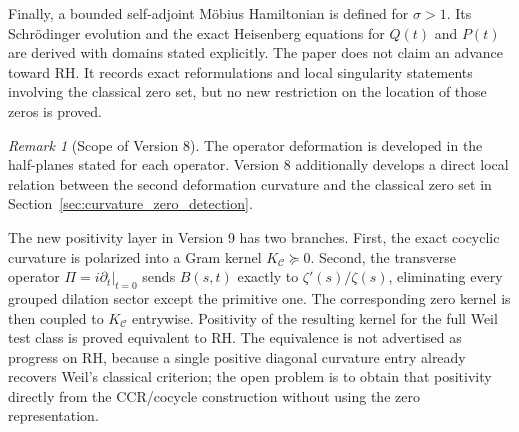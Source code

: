 \documentclass[11pt]{amsart}
\numberwithin{equation}{section}
\theoremstyle{plain}
\theoremstyle{definition}
\theoremstyle{remark}
\newtheorem{remark}[theorem]{Remark}
\begin{document}
Finally, a bounded self-adjoint M\"obius Hamiltonian is defined for
\(\sigma>1\).  Its Schr\"odinger evolution and the exact Heisenberg equations
for \(Q(t)\) and \(P(t)\) are derived with domains stated explicitly.  The
paper does not claim an advance toward RH.  It records exact reformulations and
local singularity statements involving the classical zero set, but no new
restriction on the location of those zeros is proved.

\begin{remark}[Scope of Version 8]
\label{rem:v3_scope}
The operator deformation is developed in the half-planes stated for each
operator. Version 8 additionally develops a direct local relation between the
second deformation curvature and the classical zero set in
Section~\ref{sec:curvature_zero_detection}.
\end{remark}



The new positivity layer in Version 9 has two branches.  First, the exact
cocyclic curvature is polarized into a Gram kernel
\(K_{\mathcal C}\succeq0\).  Second, the transverse operator
\(\Pi=i\partial_t|_{t=0}\) sends \(B(s,t)\) exactly to
\(\zeta'(s)/\zeta(s)\), eliminating every grouped dilation sector except the
primitive one.  The corresponding zero kernel is then coupled to
\(K_{\mathcal C}\) entrywise.  Positivity of the resulting kernel for the
full Weil test class is proved equivalent to RH.  The equivalence is not
advertised as progress on RH, because a single positive diagonal curvature
entry already recovers Weil's classical criterion; the open problem is to
obtain that positivity directly from the CCR/cocycle construction without
using the zero representation.
\end{document}
